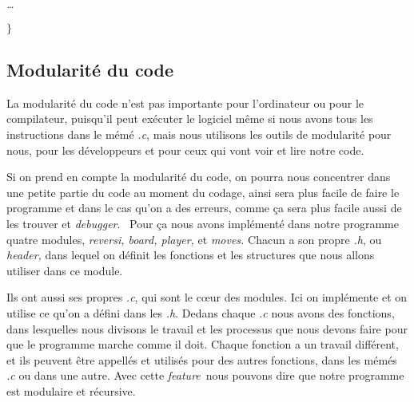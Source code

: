 \documentclass[a4paper,12pt]{article}
\begin{document}
\begin{justify}
\textit{…}
\end{justify}\par

\begin{justify}
\textit{$ \} $ }
\end{justify}\par


\vspace{\baselineskip}
	\subsection{Modularité du code}\par

\begin{justify}
La modularité du code n’est pas importante pour l’ordinateur ou pour le compilateur, puisqu’il peut exécuter le logiciel même si nous avons tous les instructions dans le mémé \textit{.c}, mais nous utilisons les outils de modularité pour nous, pour les développeurs et pour ceux qui vont voir et lire notre code.
\end{justify}\par

\begin{justify}
Si on prend en compte la modularité du code, on pourra nous concentrer dans une petite partie du code au moment du codage, ainsi sera plus facile de faire le programme et dans le cas qu’on a des erreurs, comme ça sera plus facile aussi de les trouver et \textit{debugger}.~ Pour ça nous avons implémenté dans notre programme quatre modules, \textit{reversi, board, player, }et \textit{moves. }Chacun a son propre \textit{.h}, ou \textit{header, }dans lequel on définit les fonctions et les structures que nous allons utiliser dans ce module. 
\end{justify}\par

\begin{justify}
Ils ont aussi ses propres \textit{.c}, qui sont le cœur des modules. Ici on implémente et on utilise ce qu’on a défini dans les \textit{.h}. Dedans chaque \textit{.c} nous avons des fonctions, dans lesquelles nous divisons le travail et les processus que nous devons faire pour que le programme marche comme il doit. Chaque fonction a un travail différent, et ils peuvent être appellés et utilisés pour des autres fonctions, dans les mémés \textit{.c} ou dans une autre. Avec cette \textit{feature}~nous pouvons dire que notre programme est modulaire et récursive.  
\end{justify}\par
\end{document}
